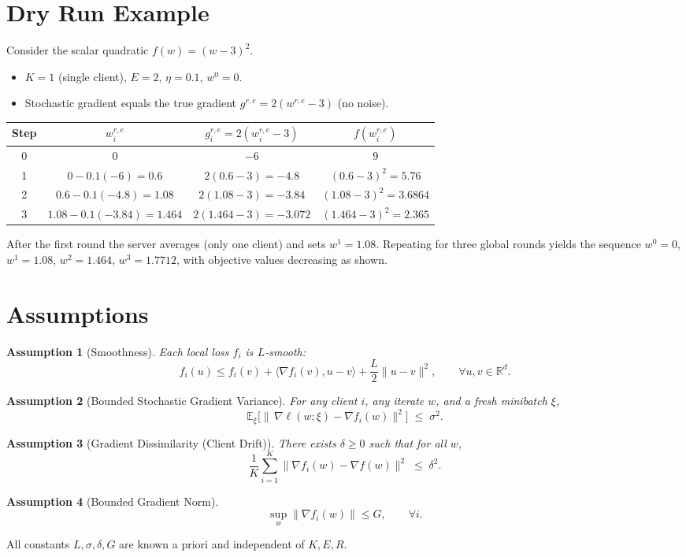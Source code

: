 \documentclass{article}
\newtheorem{assumption}{Assumption}
\newcommand{\EE}{\mathbb{E}}
\newcommand{\RR}{\mathbb{R}}
\begin{document}
\section*{Dry Run Example}
Consider the scalar quadratic $f(w)=(w-3)^{2}$.
\begin{itemize}
    \item $K=1$ (single client), $E=2$, $\eta=0.1$, $w^{0}=0$.
    \item Stochastic gradient equals the true gradient $g^{r,e}=2(w^{r,e}-3)$ (no noise).
\end{itemize}
\begin{center}
\begin{tabular}{c|c|c|c}
\textbf{Step} & $w_{i}^{r,e}$ & $g_{i}^{r,e}=2(w_{i}^{r,e}-3)$ & $f(w_{i}^{r,e})$\\\hline
0 & $0$ & $-6$ & $9$\\
1 & $0-0.1(-6)=0.6$ & $2(0.6-3)=-4.8$ & $(0.6-3)^2=5.76$\\
2 & $0.6-0.1(-4.8)=1.08$ & $2(1.08-3)=-3.84$ & $(1.08-3)^2=3.6864$\\
3 & $1.08-0.1(-3.84)=1.464$ & $2(1.464-3)=-3.072$ & $(1.464-3)^2=2.365$\\
\end{tabular}
\end{center}
After the first round the server averages (only one client) and sets $w^{1}=1.08$.
Repeating for three global rounds yields the sequence $w^{0}=0$, $w^{1}=1.08$, $w^{2}=1.464$, $w^{3}=1.7712$, with objective values decreasing as shown.

\newpage

\section*{Assumptions}
\begin{assumption}[Smoothness]\label{ass:smooth}
Each local loss $f_i$ is $L$‑smooth:
\[
    f_i(u)\le f_i(v)+\langle\nabla f_i(v),u-v\rangle+\frac{L}{2}\|u-v\|^{2},
    \qquad\forall u,v\in\RR^{d}.
\]
\end{assumption}
\begin{assumption}[Bounded Stochastic Gradient Variance]\label{ass:var}
For any client $i$, any iterate $w$, and a fresh minibatch $\xi$,
\[
    \EE_{\xi}\!\big[\|\,\nabla\ell(w;\xi)-\nabla f_i(w)\|^{2}\big]\;\le\;\sigma^{2}.
\]
\end{assumption}
\begin{assumption}[Gradient Dissimilarity (Client Drift)]\label{ass:drift}
There exists $\delta\ge0$ such that for all $w$,
\[
    \frac1K\sum_{i=1}^{K}\big\|\nabla f_i(w)-\nabla f(w)\big\|^{2}\;\le\;\delta^{2}.
\]
\end{assumption}
\begin{assumption}[Bounded Gradient Norm]\label{ass:bound}
\[
    \sup_{w}\|\nabla f_i(w)\|\le G,\qquad\forall i.
\]
\end{assumption}
All constants $L,\sigma,\delta,G$ are known a priori and independent of $K,E,R$.
\end{document}
